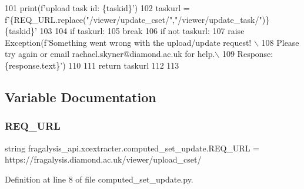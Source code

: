 \begin{DoxyCode}
101             print(f\textcolor{stringliteral}{'upload task id: \{taskid\}'})
102             taskurl = f\textcolor{stringliteral}{'\{REQ\_URL.replace("/viewer/update\_cset/","/viewer/update\_task/")\}\{taskid\}'}
103 
104             \textcolor{keywordflow}{if} taskurl:
105                 \textcolor{keywordflow}{break}
106     \textcolor{keywordflow}{if} \textcolor{keywordflow}{not} taskurl:
107         \textcolor{keywordflow}{raise} Exception(f\textcolor{stringliteral}{'Something went wrong with the upload/update request! \(\backslash\)}
108 \textcolor{stringliteral}{                        Please try again or email rachael.skyner@diamond.ac.uk for help.\(\backslash\)}
109 \textcolor{stringliteral}{                        Response: \{response.text\}'})
110 
111     \textcolor{keywordflow}{return} taskurl
112 
113 
\end{DoxyCode}


\subsection{Variable Documentation}
\mbox{\label{namespacefragalysis__api_1_1xcextracter_1_1computed__set__update_adefba58b79837d4e7133a92963544f3f}} 
\subsubsection{\texorpdfstring{R\+E\+Q\+\_\+\+U\+RL}{REQ\_URL}}
{\footnotesize\ttfamily string fragalysis\+\_\+api.\+xcextracter.\+computed\+\_\+set\+\_\+update.\+R\+E\+Q\+\_\+\+U\+RL = \textquotesingle{}https\+://fragalysis.\+diamond.\+ac.\+uk/viewer/upload\+\_\+cset/\textquotesingle{}}



Definition at line 8 of file computed\+\_\+set\+\_\+update.\+py.

